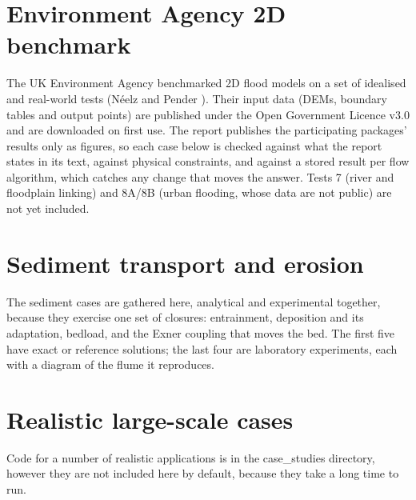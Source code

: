 \chapter{Environment Agency 2D benchmark} \label{ch:ea}
The UK Environment Agency benchmarked 2D flood models on a set of
idealised and real-world tests (N\'eelz and Pender
\cite{NeelzPender2013}). Their input data (DEMs, boundary tables and
output points) are published under the Open Government Licence v3.0 and
are downloaded on first use. The report publishes the participating
packages' results only as figures, so each case below is checked against
what the report states in its text, against physical constraints, and
against a stored result per flow algorithm, which catches any change that
moves the answer. Tests 7 (river and floodplain linking) and 8A/8B (urban
flooding, whose data are not public) are not yet included.


\chapter{Sediment transport and erosion} \label{ch:sediment}

The sediment cases are gathered here, analytical and experimental together,
because they exercise one set of closures: entrainment, deposition and its
adaptation, bedload, and the Exner coupling that moves the bed. The first
five have exact or reference solutions; the last four are laboratory
experiments, each with a diagram of the flume it reproduces.



\chapter{Realistic large-scale cases} \label{ch:casestudy}
Code for a number of realistic applications is in the case\_studies directory,
however they are not included here by default, because they take a long time to
run.

